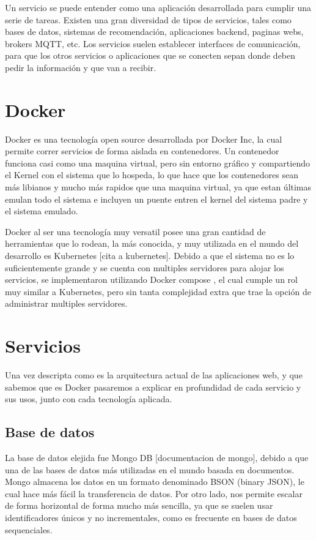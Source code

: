 Un servicio se puede entender como una aplicación desarrollada para cumplir una serie de tareas. Existen una gran diversidad de tipos de servicios, tales como bases de datos, sistemas de recomendación, aplicaciones backend, paginas webs, brokers MQTT, etc. Los servicios suelen establecer interfaces de comunicación, para que los otros servicios o aplicaciones que se conecten sepan donde deben pedir la información y que van a recibir.

\section{Docker}

Docker es una tecnología open source desarrollada por Docker Inc, la cual permite correr servicios de forma aislada en contenedores. Un contenedor funciona casi como una maquina virtual, pero sin entorno gráfico y compartiendo el Kernel \cite{httpswwwfacebookcomgrokkeepcoding_que_2022} con el sistema que lo hospeda, lo que hace que los contenedores sean más libianos y mucho más rapidos que una maquina virtual, ya que estan últimas emulan todo el sistema e incluyen un puente entren el kernel del sistema padre y el sistema emulado.

Docker al ser una tecnología muy versatil posee una gran cantidad de herramientas que lo rodean, la más conocida, y muy utilizada en el mundo del desarrollo es Kubernetes [cita a kubernetes]. Debido a que el sistema no es lo suficientemente grande y se cuenta con multiples servidores para alojar los servicios, se implementaron utilizando Docker compose \cite{noauthor_docker_2023}, el cual cumple un rol muy similar a Kubernetes, pero sin tanta complejidad extra que trae la opción de administrar multiples servidores.

\section{Servicios}

Una vez descripta como es la arquitectura actual de las aplicaciones web, y que sabemos que es Docker pasaremos a explicar en profundidad de cada servicio y sus usos, junto con cada tecnología aplicada.

\subsection{Base de datos}

La base de datos elejida fue Mongo DB [documentacion de mongo], debido a que una de las bases de datos más utilizadas en el mundo basada en documentos. Mongo almacena los datos en un formato denominado BSON (binary JSON), le cual hace más fácil la transferencia de datos. Por otro lado, nos permite escalar de forma horizontal de forma mucho más sencilla, ya que se suelen usar identificadores únicos y no incrementales, como es frecuente en bases de datos sequenciales.

